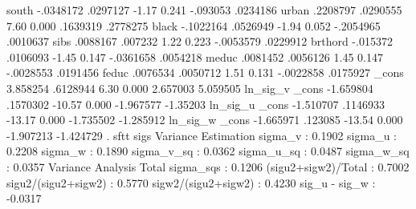          south {\VBAR}  -.0348172   .0297127    -1.17   0.241     -.093053    .0234186
         urban {\VBAR}   .2208797   .0290555     7.60   0.000     .1639319    .2778275
         black {\VBAR}  -.1022164   .0526949    -1.94   0.052    -.2054965    .0010637
          sibs {\VBAR}   .0088167    .007232     1.22   0.223    -.0053579    .0229912
       brthord {\VBAR}   -.015372   .0106093    -1.45   0.147    -.0361658    .0054218
         meduc {\VBAR}   .0081452   .0056126     1.45   0.147    -.0028553    .0191456
         feduc {\VBAR}   .0076534   .0050712     1.51   0.131    -.0022858    .0175927
         _cons {\VBAR}   3.858254   .6128944     6.30   0.000     2.657003    5.059505
ln_sig_v       {\VBAR}
         _cons {\VBAR}  -1.659804   .1570302   -10.57   0.000    -1.967577    -1.35203
ln_sig_u       {\VBAR}
         _cons {\VBAR}  -1.510707   .1146933   -13.17   0.000    -1.735502   -1.285912
ln_sig_w       {\VBAR}
         _cons {\VBAR}  -1.665971    .123085   -13.54   0.000    -1.907213   -1.424729
{\smallskip}
. sftt sigs
{\smallskip}
               Variance Estimation          
sigma_v    :       0.1902
sigma_u    :       0.2208
sigma_w    :       0.1890
sigma_v_sq :       0.0362
sigma_u_sq :       0.0487
sigma_w_sq :       0.0357
               Variance Analysis          
Total sigma_sqs     :  0.1206
(sigu2+sigw2)/Total :  0.7002
sigu2/(sigu2+sigw2) :  0.5770
sigw2/(sigu2+sigw2) :  0.4230
sig_u - sig_w       : -0.0317
